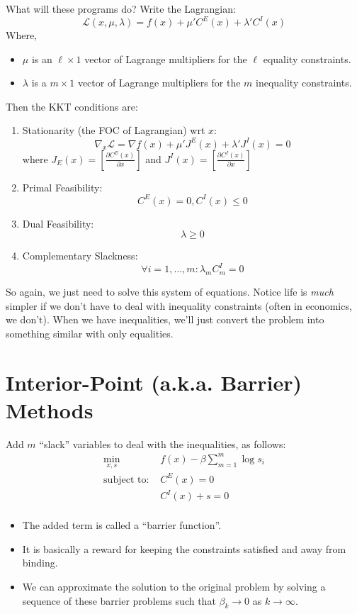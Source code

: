 \documentclass[twoside]{article}
\begin{document}
What will these programs do? Write the Lagrangian: 
$$ \mathcal{L}(x, \mu, \lambda) = f(x) + \mu' C^E(x) + \lambda' C^I(x) $$
Where,
\begin{itemize} 
\item $\mu$ is an $\ell \times 1$ vector of Lagrange multipliers for the $\ell$ equality constraints. 
\item $\lambda$ is a $m \times 1$ vector of Lagrange multipliers for the $m$ inequality constraints. 
\end{itemize}
Then the KKT conditions are:
\begin{enumerate}
\item Stationarity (the FOC of Lagrangian) wrt $x$: 
$$ \nabla_x \mathcal{L} = \nabla f(x) + \mu' J^E(x) + \lambda' J^I(x) = 0 $$
where $J_E(x) = \left[ \frac{\partial C^E(x)}{\partial x} \right]$ and $J^I(x) = \left[ \frac{\partial C^I(x)}{\partial x} \right]$
\item Primal Feasibility:
$$C^E(x) = 0, C^I(x) \leq 0 $$
\item Dual Feasibility: 
$$\lambda \geq 0$$
\item Complementary Slackness:
$$ \forall i = 1, \ldots, m: \lambda_m C^I_m = 0 $$
\end{enumerate}
So again, we just need to solve this system of equations.  Notice life is {\it much} simpler if we don't have to deal with inequality constraints (often in economics, we don't). When we have inequalities, we'll just convert the problem into something similar with only equalities. 

\section{Interior-Point (a.k.a. Barrier) Methods}

Add $m$ ``slack'' variables to deal with the inequalities, as follows: 
\begin{align*}
\min_{x,s} & f(x) - \beta \sum_{m=1}^m \log s_i \\
\mbox{subject to: } & C^E(x) = 0 \\
& C^I(x) + s = 0 \\ 
\end{align*}
\begin{itemize}
\item The added term is called a ``barrier function''. 
\item It is basically a reward for keeping the constraints satisfied and away from binding. 
\item We can approximate the solution to the original problem by solving a sequence of these barrier problems such that $\beta_k \rightarrow 0$ as $k\rightarrow \infty$. 
\end{itemize}
 
\end{document}

